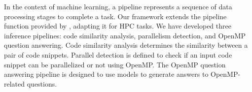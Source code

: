 In the context of machine learning, a pipeline represents a sequence of data processing stages to complete a task. Our \ourwork framework extends the pipeline function provided by \face, adapting it for HPC tasks.  
We have developed three inference pipelines: code similarity analysis, parallelism detection, and OpenMP question answering. Code similarity analysis determines the similarity between a pair of code snippets. 
Parallel detection is defined to check if an input code snippet can be parallelized or not using OpenMP.  The OpenMP question answering pipeline is designed to use models to generate answers to OpenMP-related questions. %



